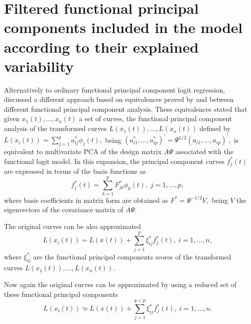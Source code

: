 \section{Filtered functional principal components included in the model according to their explained variability}

Alternatively to ordinary functional principal component logit regression, \cite{Escabias2014} discussed a different approach based on equivalences proved by \cite{Ocana2007} and \cite{Ocana1999} between different functional principal component analysis. These equivalences stated that given $x_{1}\left( t\right) ,\ldots ,x_{n}\left( t\right) $ a set of curves, the functional principal component analysis of the transformed curves $L(x_1(t)),\ldots,L(x_n(t))$ defined by $L(x_i(t))=\sum_{j=1}^p a_{ij}^{\ast} \phi_j(t),$ being
$(a_{i1}^{\ast},\ldots,a_{ip}^{\ast})^{\prime}=\Psi^{1/2} (a_{i1},\ldots,a_{ip})^{\prime},$ is equivalent to multivariate PCA of the design matrix $A\Psi$ associated with the functional logit model. In this expansion, the principal component curves $f_{j}^{\ast}\left( t\right)$ are expressed in terms of the basis functions as
\begin{equation*}
f_{j}^{\ast}\left( t\right) =\sum_{k=1}^{p}F_{jk}^{\ast}\phi _{k}\left( t\right), \;
j=1,\ldots,p,
\end{equation*}
where basis coefficients in matrix form are obtained as $F^{\ast}=\Psi^{-1/2}V,$ being $V$ the eigenvectors of the covariance matrix of $A\Psi.$

The original curves can be also approximated
\begin{equation*}
L(x_{i}\left( t\right)) =L(\overline{x}(t))+\sum_{j=1}^{p }\xi_{ij}^{\ast}f_{j}^{\ast}\left( t\right),\;i=1,\ldots ,n,
\end{equation*}
where $\xi_{ij}^{\ast}$ are the functional principal components scores of the transformed curves $L(x_1(t)),\ldots,L(x_n(t)).$

Now again the original curves can be approximated by using a reduced set of these functional principal components
\begin{equation*}
L(x_{i}\left( t\right)) \simeq L(\overline{x}(t)) + \sum_{j=1}^{q<p }\xi_{ij}^{\ast}f_{j}^{\ast}\left( t\right),\;i=1,\ldots ,n.
\end{equation*}

